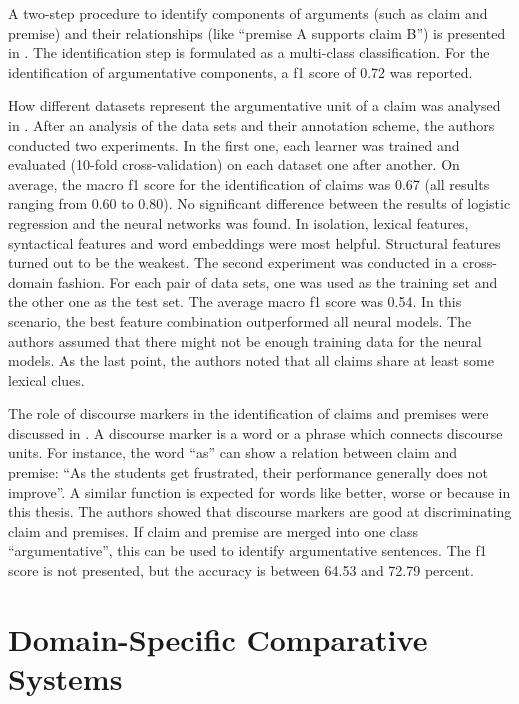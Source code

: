 A two-step procedure to identify components of arguments (such as claim and premise) and their relationships (like \enquote{premise A supports claim B}) is presented in \cite{Stab2014Identifying-Arg}. The identification step is formulated as a multi-class classification. For the identification of argumentative components, a f1 score of 0.72 was reported.

How different datasets represent the argumentative unit of a claim was analysed in \cite{Daxenberger2017What-is-the-Ess}. After an analysis of the data sets and their annotation scheme, the authors conducted two experiments.
In the first one, each learner was trained and evaluated (10-fold cross-validation) on each dataset one after another. On average, the macro f1 score for the identification of claims was 0.67 (all results ranging from 0.60 to 0.80). No significant difference between the results of logistic regression and the neural networks was found. In isolation, lexical features, syntactical features and word embeddings were most helpful. Structural features turned out to be the weakest.
The second experiment was conducted in a cross-domain fashion. For each pair of data sets, one was used as the training set and the other one as the test set. The average macro f1 score was 0.54. In this scenario, the best feature combination outperformed all neural models. The authors assumed that there might not be enough training data for the neural models.
As the last point, the authors noted that all claims share at least some lexical clues.


The role of discourse markers in the identification of claims and premises were discussed in \cite{Eckle-Kohler2015On-the-Role-of-}. A discourse marker is a word or a phrase which connects discourse units. For instance, the word \enquote{as} can show a relation between claim and premise: \enquote{As the students get frustrated, their performance generally does not improve}.  A similar function is expected for words like better, worse or because in this thesis. The authors showed that discourse markers are good at discriminating claim and premises. If claim and premise are merged into one class \enquote{argumentative}, this can be used to identify argumentative sentences. The f1 score is not presented, but the accuracy is between 64.53 and 72.79 percent.



\section{Domain-Specific Comparative Systems}
\label{sec:domainspec}


